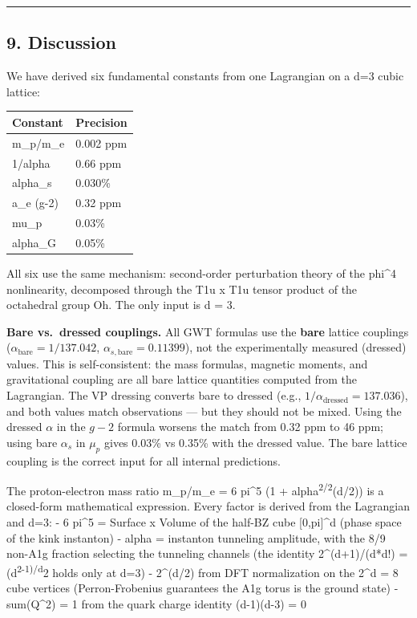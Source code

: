 \documentclass[
]{article}
\newcounter{none} %
\begin{document}
\begin{center}\rule{0.5\linewidth}{0.5pt}\end{center}

\subsection{9. Discussion}\label{discussion}

We have derived six fundamental constants from one Lagrangian on a d=3
cubic lattice:

{\def\LTcaptype{none} %
\begin{longtable}[]{@{}ll@{}}
\toprule\noalign{}
Constant & Precision \\
\midrule\noalign{}
\endhead
\bottomrule\noalign{}
\endlastfoot
m\_p/m\_e & 0.002 ppm \\
1/alpha & 0.66 ppm \\
alpha\_s & 0.030\% \\
a\_e (g-2) & 0.32 ppm \\
mu\_p & 0.03\% \\
alpha\_G & 0.05\% \\
\end{longtable}
}

All six use the same mechanism: second-order perturbation theory of the
phi\^{}4 nonlinearity, decomposed through the T1u x T1u tensor product
of the octahedral group Oh. The only input is d = 3.

\textbf{Bare vs.~dressed couplings.} All GWT formulas use the
\textbf{bare} lattice couplings (\(\alpha_{\text{bare}} = 1/137.042\),
\(\alpha_{s,\text{bare}} = 0.11399\)), not the experimentally measured
(dressed) values. This is self-consistent: the mass formulas, magnetic
moments, and gravitational coupling are all bare lattice quantities
computed from the Lagrangian. The VP dressing converts bare to dressed
(e.g., \(1/\alpha_{\text{dressed}} = 137.036\)), and both values match
observations --- but they should not be mixed. Using the dressed
\(\alpha\) in the \(g-2\) formula worsens the match from 0.32 ppm to 46
ppm; using bare \(\alpha_s\) in \(\mu_p\) gives 0.03\% vs 0.35\% with
the dressed value. The bare lattice coupling is the correct input for
all internal predictions.

The proton-electron mass ratio m\_p/m\_e = 6 pi\^{}5 (1 +
alpha\textsuperscript{2/2}(d/2)) is a closed-form mathematical
expression. Every factor is derived from the Lagrangian and d=3: - 6
pi\^{}5 = Surface x Volume of the half-BZ cube {[}0,pi{]}\^{}d (phase
space of the kink instanton) - alpha = instanton tunneling amplitude,
with the 8/9 non-A1g fraction selecting the tunneling channels (the
identity 2\^{}(d+1)/(d*d!) = (d\textsuperscript{2-1)/d}2 holds only at
d=3) - 2\^{}(d/2) from DFT normalization on the 2\^{}d = 8 cube vertices
(Perron-Frobenius guarantees the A1g torus is the ground state) -
sum(Q\^{}2) = 1 from the quark charge identity (d-1)(d-3) = 0
\end{document}
